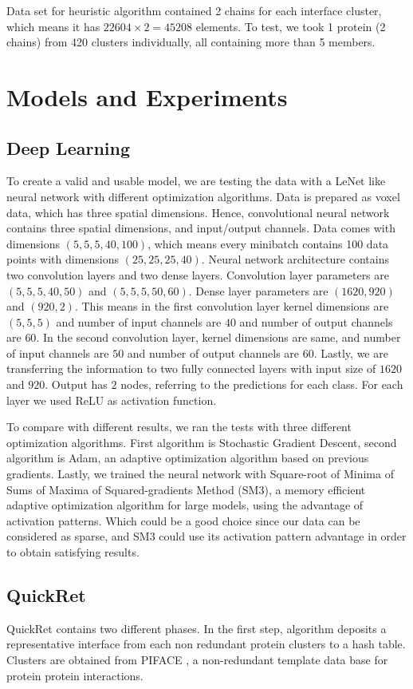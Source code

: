 \documentclass{article}
\begin{document}
Data set for heuristic algorithm contained 2 chains for each interface cluster, which means it has $22604 \times 2 = 45208$ elements. To test, we took 1 protein (2 chains) from 420 clusters individually, all containing more than 5 members.

\section{Models and Experiments}
\subsection{Deep Learning}
To create a valid and usable model, we are testing the data with a LeNet\citep{726791} like neural network with different optimization algorithms. Data is prepared as voxel data, which has three spatial dimensions. Hence, convolutional neural network contains three spatial dimensions, and input/output channels. Data comes with dimensions $(5,5,5,40,100)$, which means every minibatch contains 100 data points with dimensions $(25,25,25,40)$. Neural network architecture contains two convolution layers and two dense layers. Convolution layer parameters are $(5,5,5,40,50)$ and $(5,5,5,50,60)$. Dense layer parameters are $(1620,920)$ and $(920,2)$. This means in the first convolution layer kernel dimensions are $(5,5,5)$ and number of input channels are $40$ and number of output channels are $60$. In the second convolution layer, kernel dimensions are same, and number of input channels are $50$ and number of output channels are $60$. Lastly, we are transferring the information to two fully connected layers with input size of $1620$ and $920$. Output has $2$ nodes, referring to the predictions for each class. For each layer we used ReLU as activation function.

To compare with different results, we ran the tests with three different optimization algorithms. First algorithm is Stochastic Gradient Descent, second algorithm is Adam\citep{kingma2014adam}, an adaptive optimization algorithm based on previous gradients. Lastly, we trained the neural network with Square-root of Minima of Sums of Maxima of Squared-gradients Method (SM3)\citep{anil2019memory}, a memory efficient adaptive optimization algorithm for large models, using the advantage of activation patterns. Which could be a good choice since our data can be considered as sparse, and SM3 could use its activation pattern advantage in order to obtain satisfying results.

\subsection{QuickRet}
QuickRet contains two different phases. In the first step, algorithm deposits a representative interface from each non redundant protein clusters to a hash table. Clusters are obtained from PIFACE \citep{RN5}, a non-redundant template data base for protein protein interactions.
\end{document}
